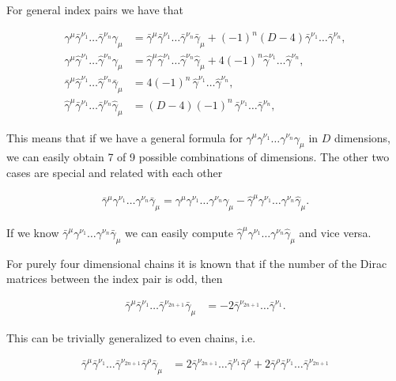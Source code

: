 \documentclass[../FeynCalcManual.tex]{subfiles}
\begin{document}
For general index pairs we have that

\begin{align}
\gamma^\mu \bar{\gamma}^{\nu_1} \dots \bar{\gamma}^{\nu_n} \gamma_\mu &= \bar{\gamma}^\mu \bar{\gamma}^{\nu_1} \dots \bar{\gamma}^{\nu_n} \bar{\gamma}_\mu + (-1)^n (D-4) \bar{\gamma}^{\nu_1} \dots \bar{\gamma}^{\nu_n}, \\
\gamma^\mu \hat{\gamma}^{\nu_1} \dots \hat{\gamma}^{\nu_n} \gamma_\mu &= \hat{\gamma}^\mu \hat{\gamma}^{\nu_1} \dots \hat{\gamma}^{\nu_n} \hat{\gamma}_\mu + 4 (-1)^n  \hat{\gamma}^{\nu_1} \dots \hat{\gamma}^{\nu_n}, \\
\bar{\gamma}^\mu \hat{\gamma}^{\nu_1} \dots \hat{\gamma}^{\nu_n} \bar{\gamma}_\mu &= 4 (-1)^n \, \hat{\gamma}^{\nu_1} \dots \hat{\gamma}^{\nu_n}, \\
\hat{\gamma}^\mu \bar{\gamma}^{\nu_1} \dots \bar{\gamma}^{\nu_n} \hat{\gamma}_\mu &= (D-4) (-1)^n  \, \bar{\gamma}^{\nu_1} \dots \bar{\gamma}^{\nu_n},
\end{align}

This means that if we have a general formula for
\(\gamma^\mu \gamma^{\nu_1} \dots \gamma^{\nu_n} \gamma_\mu\) in \(D\)
dimensions, we can easily obtain 7 of 9 possible combinations of
dimensions. The other two cases are special and related with each other

\begin{align}
\bar{\gamma}^\mu \gamma^{\nu_1} \dots \gamma^{\nu_n} \bar{\gamma}_\mu = \gamma^\mu \gamma^{\nu_1} \dots \gamma^{\nu_n} \gamma_\mu - \hat{\gamma}^\mu \gamma^{\nu_1} \dots \gamma^{\nu_n} \hat{\gamma}_\mu.
\end{align}

If we know
\(\bar{\gamma}^\mu \gamma^{\nu_1} \dots \gamma^{\nu_n} \bar{\gamma}_\mu\)
we can easily compute
\(\hat{\gamma}^\mu \gamma^{\nu_1} \dots \gamma^{\nu_n} \hat{\gamma}_\mu\)
and vice versa.

For purely four dimensional chains it is known that if the number of the
Dirac matrices between the index pair is odd, then

\begin{align}
\bar{\gamma}^\mu \bar{\gamma}^{\nu_1} \dots \bar{\gamma}^{\nu_{2n+1}} \bar{\gamma}_\mu & = -2 \bar{\gamma}^{\nu_{2n+1}} \dots \bar{\gamma}^{\nu_1}.
\end{align}

This can be trivially generalized to even chains, i.e.

\begin{align}
\bar{\gamma}^\mu \bar{\gamma}^{\nu_1} \dots \bar{\gamma}^{\nu_{2n+1}} \bar{\gamma}^\rho \bar{\gamma}_\mu & = 2 \bar{\gamma}^{\nu_{2n+1}} \dots \bar{\gamma}^{\nu_1} \bar{\gamma}^\rho + 2 \bar{\gamma}^\rho \bar{\gamma}^{\nu_1} \dots \bar{\gamma}^{\nu_{2n+1}}
\end{align}
\end{document}
